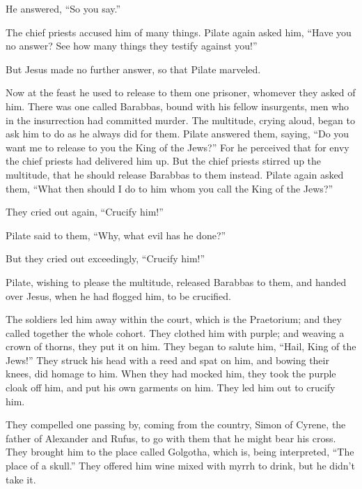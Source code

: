 He answered, ``So you say.''

 The chief priests accused him of many things.
 Pilate again asked him, ``Have you no answer? See how
many things they testify against you!''

 But Jesus made no further answer, so that Pilate
marveled.

 Now at the feast he used to release to them one prisoner,
whomever they asked of him.  There was one called
Barabbas, bound with his fellow insurgents, men who in the insurrection
had committed murder.  The multitude, crying aloud, began
to ask him to do as he always did for them.  Pilate
answered them, saying, ``Do you want me to release to you the King of
the Jews?''  For he perceived that for envy the chief
priests had delivered him up.  But the chief priests
stirred up the multitude, that he should release Barabbas to them
instead.  Pilate again asked them, ``What then should I
do to him whom you call the King of the Jews?''

 They cried out again, ``Crucify him!''

 Pilate said to them, ``Why, what evil has he done?''

But they cried out exceedingly, ``Crucify him!''

 Pilate, wishing to please the multitude, released
Barabbas to them, and handed over Jesus, when he had flogged him, to be
crucified.

 The soldiers led him away within the court, which is the
Praetorium; and they called together the whole cohort. 
They clothed him with purple; and weaving a crown of thorns, they put it
on him.  They began to salute him, ``Hail, King of the
Jews!''  They struck his head with a reed and spat on
him, and bowing their knees, did homage to him.  When
they had mocked him, they took the purple cloak off him, and put his own
garments on him. They led him out to crucify him.

 They compelled one passing by, coming from the country,
Simon of Cyrene, the father of Alexander and Rufus, to go with them that
he might bear his cross.  They brought him to the place
called Golgotha, which is, being interpreted, ``The place of a skull.''
 They offered him wine mixed with myrrh to drink, but he
didn't take it.

